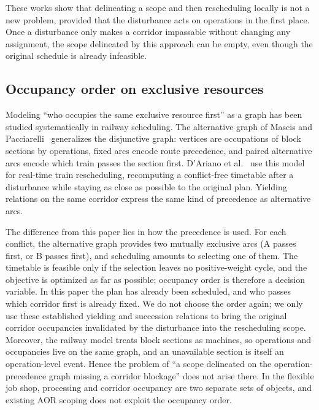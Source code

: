 These works show that delineating a scope and then rescheduling locally is not a new problem, provided that the disturbance acts on operations in the first place.
Once a disturbance only makes a corridor impassable without changing any assignment, the scope delineated by this approach can be empty, even though the original schedule is already infeasible.

\subsection{Occupancy order on exclusive resources}
\label{sec:rw_ag}

Modeling ``who occupies the same exclusive resource first'' as a graph has been studied systematically in railway scheduling.
The alternative graph of Mascis and Pacciarelli~\cite{mascis2002alternative}
generalizes the disjunctive graph: vertices are occupations of block sections by operations, fixed arcs encode route precedence,
and paired alternative arcs encode which train passes the section first.
D'Ariano et al.~\cite{dariano2007branch} use this model for real-time train rescheduling,
recomputing a conflict-free timetable after a disturbance while staying as close as possible to the original plan.
Yielding relations on the same corridor express the same kind of precedence as alternative arcs.

The difference from this paper lies in how the precedence is used. For each conflict, the alternative graph provides two mutually exclusive arcs
(A passes first, or B passes first), and scheduling amounts to selecting one of them.
The timetable is feasible only if the selection leaves no positive-weight cycle, and the objective is optimized as far as possible; occupancy order is therefore a decision variable.
In this paper the plan has already been scheduled, and who passes which corridor first is already fixed. We do not choose the order again;
we only use these established yielding and succession relations to bring the original corridor occupancies invalidated by the disturbance into the rescheduling scope.
Moreover, the railway model treats block sections as machines, so operations and occupancies live on the same graph,
and an unavailable section is itself an operation-level event. Hence the problem of ``a scope delineated on the operation-precedence graph missing a corridor blockage'' does not arise there.
In the flexible job shop, processing and corridor occupancy are two separate sets of objects, and existing AOR scoping does not exploit the occupancy order.

